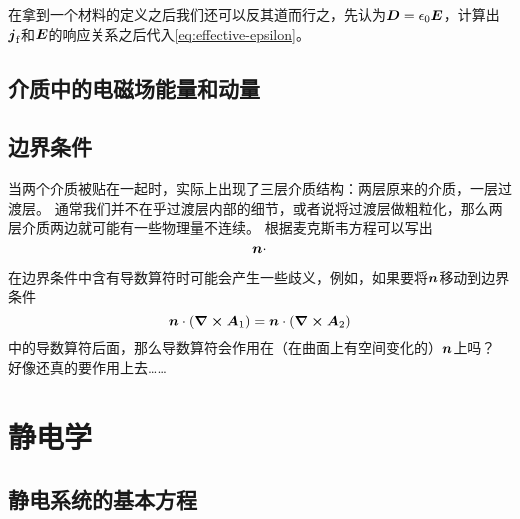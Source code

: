 \documentclass[UTF8, a4paper]{ctexart}
\begin{document}
在拿到一个材料的定义之后我们还可以反其道而行之，先认为$\vb*{D} = \epsilon_0 \vb*{E}$，计算出$\vb*{j}_\text{f}$和$\vb*{E}$的响应关系之后代入\eqref{eq:effective-epsilon}。

\subsection{介质中的电磁场能量和动量}

\subsection{边界条件}

当两个介质被贴在一起时，实际上出现了三层介质结构：两层原来的介质，一层过渡层。
通常我们并不在乎过渡层内部的细节，或者说将过渡层做粗粒化，那么两层介质两边就可能有一些物理量不连续。
根据麦克斯韦方程可以写出
\begin{equation}
    \vb*{n} \cdot 
\end{equation}

在边界条件中含有导数算符时可能会产生一些歧义，例如，如果要将$\vb*{n}$移动到边界条件
\[
    \vb*{n} \cdot (\curl{\vb*{A}_1}) = \vb*{n} \cdot (\curl{\vb*{A}_2})
\]
中的导数算符后面，那么导数算符会作用在（在曲面上有空间变化的）$\vb*{n}$上吗？
好像还真的要作用上去……

\section{静电学}

\subsection{静电系统的基本方程}
\end{document}
